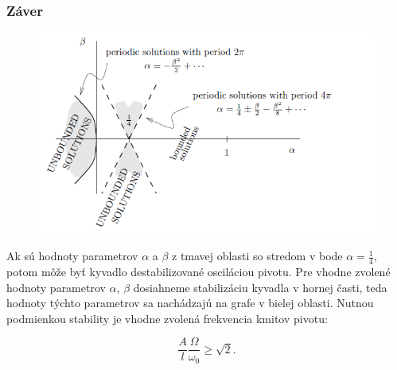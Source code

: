 \documentclass{beamer}
\begin{document}
\begin{frame}
\frametitle{Záver}


\begin{figure}
\includegraphics[scale=0.45]{Boundary-graph.png}
\end{figure}
Ak sú hodnoty parametrov $\alpha$ a $\beta$ z tmavej oblasti so stredom v bode $\alpha=\frac{1}{4}$, potom môže byť kyvadlo destabilizované osciláciou pivotu.
Pre vhodne zvolené hodnoty parametrov $\alpha$, $\beta$ dosiahneme stabilizáciu kyvadla v hornej časti, teda hodnoty týchto parametrov sa nachádzajú na grafe v bielej oblasti. Nutnou podmienkou stability je vhodne zvolená frekvencia kmitov pivotu:
 
\begin{equation*}
\frac{A}{l}\frac{\Omega}{\omega_0}\geq \sqrt{2}.
\end{equation*}  
 

\end{frame}
\end{document}
